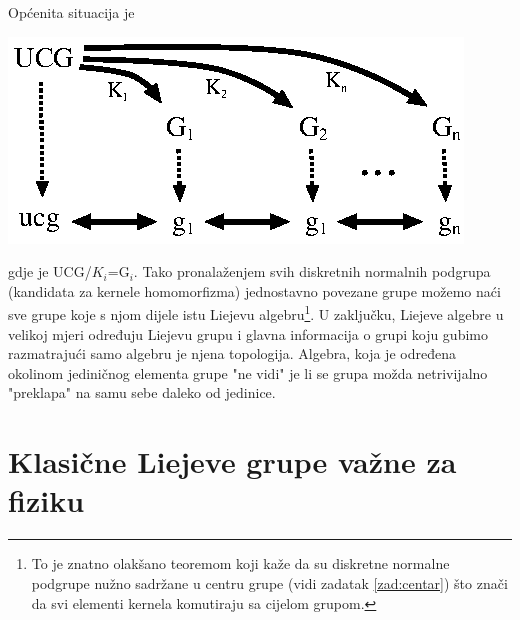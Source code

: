 Općenita situacija je\\[1ex]

\centerline{\includegraphics[scale=1.0]{pics/ucg.eps}}

gdje je UCG/$K_i$=G$_i$. Tako pronalaženjem svih diskretnih normalnih
podgrupa (kandidata za kernele homomorfizma) jednostavno povezane grupe 
možemo naći sve grupe koje
s njom dijele istu Liejevu algebru\footnote{To je znatno olakšano teoremom
koji kaže da su diskretne normalne podgrupe nužno sadržane u
centru grupe (vidi zadatak \ref{zad:centar}) što znači da svi elementi
kernela komutiraju sa cijelom grupom.}.
U zaključku, Liejeve algebre u velikoj mjeri određuju Liejevu grupu i
glavna informacija o grupi koju gubimo razmatrajući samo algebru
je njena topologija. Algebra, koja je određena okolinom jediničnog
elementa grupe "ne vidi" je li se grupa možda netrivijalno "preklapa"
na samu sebe daleko od jedinice.


\section{Klasične Liejeve grupe važne za fiziku}
\label{sec:primjeriLie}

